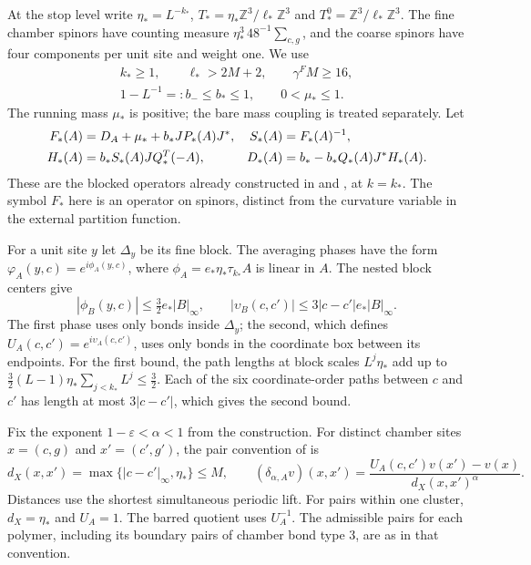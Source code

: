\documentclass[11pt,letterpaper,reqno]{amsart}
\newcommand{\Z}{\mathbb Z}
\begin{document}
At the stop level write $\eta_*=L^{-k_*}$,
$T_*=\eta_*\Z^3/\ell_*\Z^3$ and
$T_*^0=\Z^3/\ell_*\Z^3$. The fine chamber spinors
have counting measure $\eta_*^3\,48^{-1}\sum_{c,g}$,
and the coarse spinors have four components per unit
site and weight one. We use
\[
 \begin{gathered}
 k_*\ge1,\qquad \ell_*>2M+2,\qquad \gamma^FM\ge16,\\
 1-L^{-1}=:b_-\le b_*\le1,\qquad
 0<\mu_*\le1.
 \end{gathered}
\]
The running mass $\mu_*$ is positive; the bare mass
coupling is treated separately. Let
\begin{align}
 F_*(A)&=D_A+\mu_*+b_*JP_*(A)J^*,&
 S_*(A)&=F_*(A)^{-1},\notag\\
 H_*(A)&=b_*S_*(A)JQ_*^T(-A),&
 D_*(A)&=b_*-b_*Q_*(A)J^*H_*(A).
                                  \label{eq:interacting-terminal-operators}
\end{align}
These are the blocked operators already constructed
in \cite[(51)]{FermionBlock} and
\cite[(52)]{FermionBlock}, at $k=k_*$.
The symbol $F_*$ here is an operator on spinors,
distinct from the curvature variable in the external
partition function.

For a unit site $y$ let $\Delta_y$ be its fine block.
The averaging phases have the form
$\varphi_A(y,c)=e^{i\phi_A(y,c)}$, where
$\phi_A=e_*\eta_*\tau_{k_*}A$ is linear in $A$.
The nested block centers give
\begin{equation}\label{eq:interacting-phase-bounds}
 |\phi_B(y,c)|\le\tfrac32e_*|B|_\infty,\qquad
 |\upsilon_B(c,c')|\le3|c-c'|e_*|B|_\infty.
\end{equation}
The first phase uses only bonds inside $\Delta_y$;
the second, which defines $U_A(c,c')=e^{i\upsilon_A(c,c')}$,
uses only bonds in the coordinate box between its endpoints.
For the first bound, the path lengths at block scales
$L^j\eta_*$ add up to
$\frac32(L-1)\eta_*\sum_{j<k_*}L^j\le\frac32$.
Each of the six coordinate-order paths between
$c$ and $c'$ has length at most $3|c-c'|$,
which gives the second bound.

Fix the exponent $1-\varepsilon<\alpha<1$ from the construction.
For distinct chamber sites $x=(c,g)$ and $x'=(c',g')$, the
pair convention of \cite[\S2.2]{NormalizedContraction} is
\[
 d_X(x,x')=\max\{|c-c'|_\infty,\eta_*\}\le M,\qquad
 (\delta_{\alpha,A}v)(x,x')
   =\frac{U_A(c,c')v(x')-v(x)}{d_X(x,x')^\alpha}.
\]
Distances use the shortest simultaneous periodic lift.
For pairs within one cluster, $d_X=\eta_*$ and $U_A=1$.
The barred quotient uses $U_A^{-1}$.
The admissible pairs for each polymer, including its boundary
pairs of chamber bond type $3$, are as in that convention.
\end{document}
